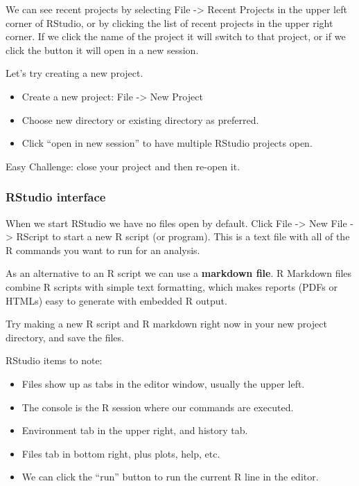 \documentclass[]{article}
\providecommand{\tightlist}{%
  \setlength{\itemsep}{0pt}\setlength{\parskip}{0pt}}
\begin{document}
We can see recent projects by selecting File -\textgreater{} Recent
Projects in the upper left corner of RStudio, or by clicking the list of
recent projects in the upper right corner. If we click the name of the
project it will switch to that project, or if we click the button it
will open in a new session.

Let's try creating a new project.

\begin{itemize}
\tightlist
\item
  Create a new project: File -\textgreater{} New Project
\item
  Choose new directory or existing directory as preferred.
\item
  Click ``open in new session'' to have multiple RStudio projects open.
\end{itemize}

Easy Challenge: close your project and then re-open it.

\subsubsection{RStudio interface}\label{rstudio-interface}

When we start RStudio we have no files open by default. Click File
-\textgreater{} New File -\textgreater{} RScript to start a new R script
(or program). This is a text file with all of the R commands you want to
run for an analysis.

As an alternative to an R script we can use a \textbf{markdown file}. R
Markdown files combine R scripts with simple text formatting, which
makes reports (PDFs or HTMLs) easy to generate with embedded R output.

Try making a new R script and R markdown right now in your new project
directory, and save the files.

RStudio items to note:

\begin{itemize}
\tightlist
\item
  Files show up as tabs in the editor window, usually the upper left.
\item
  The console is the R session where our commands are executed.
\item
  Environment tab in the upper right, and history tab.
\item
  Files tab in bottom right, plus plots, help, etc.
\item
  We can click the ``run'' button to run the current R line in the
  editor.
\end{itemize}
\end{document}
